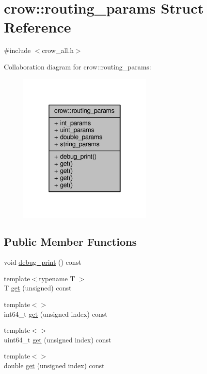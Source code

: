 \hypertarget{structcrow_1_1routing__params}{\section{crow\-:\-:routing\-\_\-params Struct Reference}
\label{structcrow_1_1routing__params}
}


{\ttfamily \#include $<$crow\-\_\-all.\-h$>$}



Collaboration diagram for crow\-:\-:routing\-\_\-params\-:
\nopagebreak
\begin{figure}[H]
\begin{center}
\leavevmode
\includegraphics[width=190pt]{structcrow_1_1routing__params__coll__graph}
\end{center}
\end{figure}
\subsection*{Public Member Functions}
\begin{DoxyCompactItemize}
\item 
void \hyperlink{structcrow_1_1routing__params_af2e694039be3d508c3f8be5369158359}{debug\-\_\-print} () const 
\item 
{\footnotesize template$<$typename T $>$ }\\T \hyperlink{structcrow_1_1routing__params_ab5387f479e8971e55efab8bc336fd055}{get} (unsigned) const 
\item 
{\footnotesize template$<$$>$ }\\int64\-\_\-t \hyperlink{structcrow_1_1routing__params_ab6bf31e182210e7e25bebfa05bab2825}{get} (unsigned index) const 
\item 
{\footnotesize template$<$$>$ }\\uint64\-\_\-t \hyperlink{structcrow_1_1routing__params_a24ced06269cd8f9c9dd304b4e82e2cd3}{get} (unsigned index) const 
\item 
{\footnotesize template$<$$>$ }\\double \hyperlink{structcrow_1_1routing__params_ac3bcff03201d1677076b154f58fcbf65}{get} (unsigned index) const 
\end{DoxyCompactItemize}
